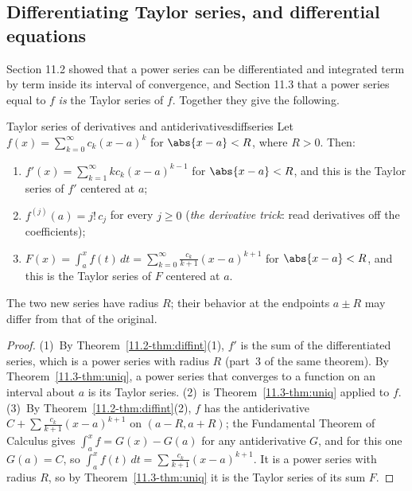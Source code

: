 \documentclass[11pt]{article}
\begin{document}
\subsection*{Differentiating Taylor series, and differential equations}

Section 11.2 showed that a power series can be differentiated and integrated term by term inside its interval of convergence, and Section 11.3 that a power series equal to $f$ \emph{is} the Taylor series of $f$. Together they give the following.

\begin{thm}{Taylor series of derivatives and antiderivatives}{diffseries}
Let $f(x)=\sum_{k=0}^\infty c_k(x-a)^k$ for $\abs{x-a}<R$, where $R>0$. Then:
\begin{enumerate}
  \item $f'(x)=\sum_{k=1}^\infty kc_k(x-a)^{k-1}$ for $\abs{x-a}<R$, and this is the Taylor series of $f'$ centered at $a$;
  \item $f^{(j)}(a)=j!\,c_j$ for every $j\ge0$ (\emph{the derivative trick}: read derivatives off the coefficients);
  \item $F(x)=\int_a^xf(t)\,dt=\sum_{k=0}^\infty\frac{c_k}{k+1}(x-a)^{k+1}$ for $\abs{x-a}<R$, and this is the Taylor series of $F$ centered at $a$.
\end{enumerate}
The two new series have radius $R$; their behavior at the endpoints $a\pm R$ may differ from that of the original.
\end{thm}
\begin{proof}
(1)~By Theorem~\ref{11.2-thm:diffint}(1), $f'$ is the sum of the differentiated series, which is a power series with radius $R$ (part~3 of the same theorem). By Theorem~\ref{11.3-thm:uniq}, a power series that converges to a function on an interval about $a$ is its Taylor series. (2)~is Theorem~\ref{11.3-thm:uniq} applied to $f$. (3)~By Theorem~\ref{11.2-thm:diffint}(2), $f$ has the antiderivative $C+\sum\frac{c_k}{k+1}(x-a)^{k+1}$ on $(a-R,a+R)$; the Fundamental Theorem of Calculus gives $\int_a^xf=G(x)-G(a)$ for any antiderivative $G$, and for this one $G(a)=C$, so $\int_a^xf(t)\,dt=\sum\frac{c_k}{k+1}(x-a)^{k+1}$. It is a power series with radius $R$, so by Theorem~\ref{11.3-thm:uniq} it is the Taylor series of its sum $F$.
\end{proof}
\end{document}
